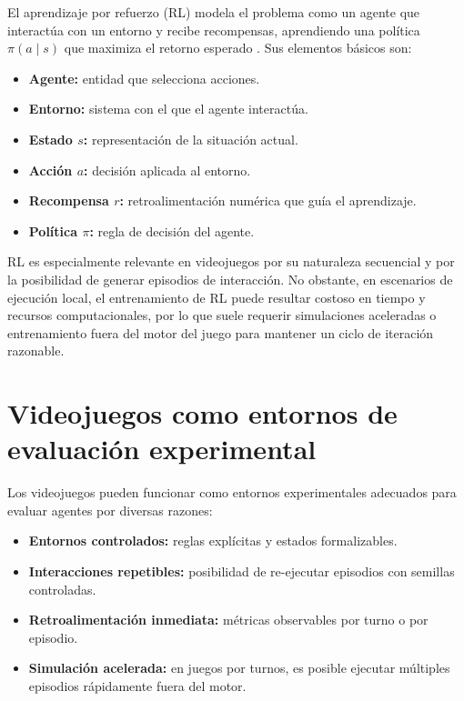El aprendizaje por refuerzo (RL) modela el problema como un agente que interactúa con un entorno y recibe recompensas, aprendiendo una política $\pi(a \mid s)$ que maximiza el retorno esperado \cite{sutton2018reinforcement}. Sus elementos básicos son:

\begin{itemize}
    \item \textbf{Agente:} entidad que selecciona acciones.
    \item \textbf{Entorno:} sistema con el que el agente interactúa.
    \item \textbf{Estado $s$:} representación de la situación actual.
    \item \textbf{Acción $a$:} decisión aplicada al entorno.
    \item \textbf{Recompensa $r$:} retroalimentación numérica que guía el aprendizaje.
    \item \textbf{Política $\pi$:} regla de decisión del agente.
\end{itemize}

RL es especialmente relevante en videojuegos por su naturaleza secuencial y por la posibilidad de generar episodios de interacción. No obstante, en escenarios de ejecución local, el entrenamiento de RL puede resultar costoso en tiempo y recursos computacionales, por lo que suele requerir simulaciones aceleradas o entrenamiento fuera del motor del juego para mantener un ciclo de iteración razonable.

\section{Videojuegos como entornos de evaluación experimental}

Los videojuegos pueden funcionar como entornos experimentales adecuados para evaluar agentes por diversas razones:

\begin{itemize}
    \item \textbf{Entornos controlados:} reglas explícitas y estados formalizables.
    \item \textbf{Interacciones repetibles:} posibilidad de re-ejecutar episodios con semillas controladas.
    \item \textbf{Retroalimentación inmediata:} métricas observables por turno o por episodio.
    \item \textbf{Simulación acelerada:} en juegos por turnos, es posible ejecutar múltiples episodios rápidamente fuera del motor.
\end{itemize}

